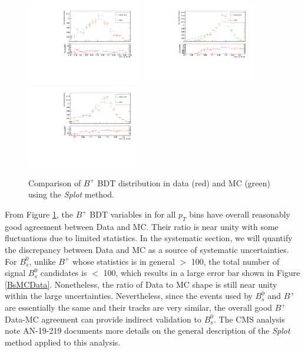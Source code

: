 \begin{figure}[h]
\begin{center}
\includegraphics[width=0.45\textwidth]{Figures/Chapter5/BDT_pt_30_40_mc_validation_Bu.pdf}
\includegraphics[width=0.45\textwidth]{Figures/Chapter5/BDT_pt_40_50_mc_validation_Bu.pdf}
\includegraphics[width=0.45\textwidth]{Figures/Chapter5/BDT_pt_50_60_mc_validation_Bu.pdf}
\caption{Comparison of $B^+$ BDT distribution in data (red) and MC (green) using the \textit{Splot} method.}
\label{BPMCData}
\end{center}
\end{figure}

From Figure \ref{BPMCData}, the $B^+$ BDT variables in for all $p_T$ bins have overall reasonably good agreement between Data and MC. Their ratio is near unity with some fluctuations due to limited statistics. In the systematic section, we will quantify the discrepancy between Data and MC as a source of systematic uncertainties. For $B^0_s$, unlike $B^+$ whose statistics is in general $>$ 100, the total number of signal $B^0_s$ candidates is $<$ 100, which results in a large error bar shown in Figure \ref{BsMCData}. Nonetheless, the ratio of Data to MC shape is still near unity within the large uncertainties. Nevertheless, since the events used by $B^0_s$ and $B^+$ are essentially the same and their tracks are very similar, the overall good $B^+$ Data-MC agreement can provide indirect validation to $B^0_s$. The CMS analysis note AN-19-219 \cite{AN-19-219} documents more details on the general description of the \textit{Splot} method applied to this analysis.  


